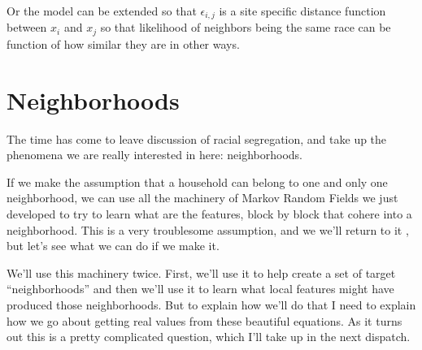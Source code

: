 \documentclass{article}
\begin{document}
Or the model can be extended so that $\epsilon_{i,j}$ is a
site specific distance function between $x_i$ and $x_j$ so that
likelihood of neighbors being the same race can be function of how
similar they are in other ways. 

\section{Neighborhoods}
The time has come to leave discussion of racial segregation, and take
up the phenomena we are really interested in here: neighborhoods.

If we make the assumption that a household can belong to one and only
one neighborhood, we can use all the machinery of Markov Random Fields
we just developed to try to learn what are the features, block by
block that cohere into a neighborhood. This is a very troublesome
assumption, and we we'll return to it , but let's see what we can do
if we make it.

We'll use this machinery twice. First, we'll use it to help create a
set of target ``neighborhoods'' and then we'll use it to learn what
local features might have produced those neighborhoods. But to explain
how we'll do that I need to explain how we go about getting real
values from these beautiful equations. As it turns out this is a pretty 
complicated question, which I'll take up in the next dispatch.
\end{document}
